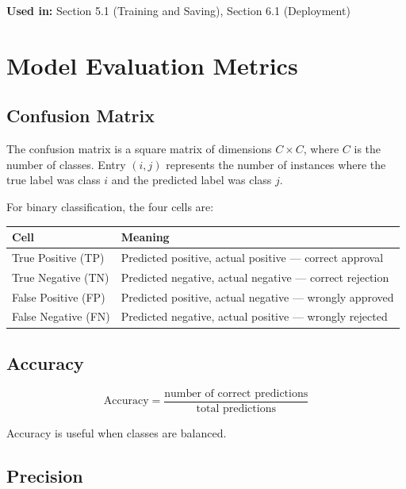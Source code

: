 \documentclass[10pt]{article}
\begin{document}
\textbf{Used in:} Section 5.1 (Training and Saving), Section 6.1 (Deployment)

\section{Model Evaluation Metrics}

\subsection{Confusion Matrix}

The confusion matrix is a square matrix of dimensions \(C \times C\), where \(C\) is the number of classes. Entry \((i,j)\) represents the number of instances where the true label was class \(i\) and the predicted label was class \(j\).

For binary classification, the four cells are:

\begin{table}[h!]
\centering
\begin{tabular}{|p{4cm}|p{9cm}|}
\hline
\textbf{Cell} & \textbf{Meaning} \\ \hline
True Positive (TP) & Predicted positive, actual positive --- correct approval \\ \hline
True Negative (TN) & Predicted negative, actual negative --- correct rejection \\ \hline
False Positive (FP) & Predicted positive, actual negative --- wrongly approved \\ \hline
False Negative (FN) & Predicted negative, actual positive --- wrongly rejected \\ \hline
\end{tabular}
\end{table}

\subsection{Accuracy}

\begin{equation}
\text{Accuracy} = \frac{\text{number of correct predictions}}{\text{total predictions}}
\end{equation}

Accuracy is useful when classes are balanced.

\subsection{Precision}
\end{document}
